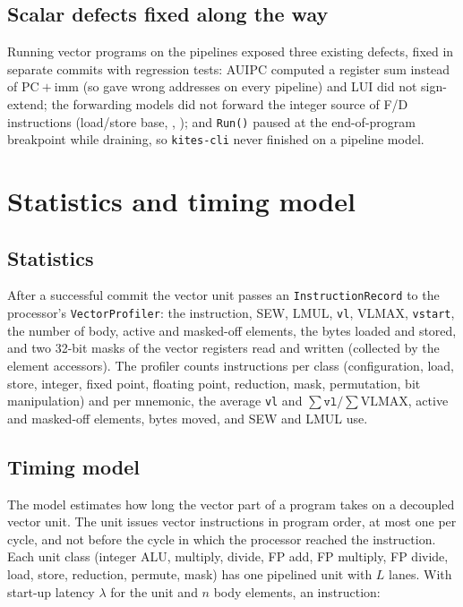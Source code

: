 \documentclass[11pt]{article}
\begin{document}
\subsection{Scalar defects fixed along the way}
Running vector programs on the pipelines exposed three existing defects, fixed in separate
commits with regression tests: AUIPC computed a register sum instead of $\mathrm{PC}+\mathrm{imm}$
(so  gave wrong addresses on every pipeline) and LUI did not sign-extend; the
forwarding models did not forward the integer source of F/D instructions (load/store base,
, ); and \texttt{Run()} paused at the end-of-program breakpoint
while draining, so \texttt{kites-cli} never finished on a pipeline model.

\section{Statistics and timing model}\label{sec:timing}

\subsection{Statistics}
After a successful commit the vector unit passes an \texttt{InstructionRecord} to the processor's
\texttt{VectorProfiler}: the instruction, SEW, LMUL, \texttt{vl}, VLMAX, \texttt{vstart}, the
number of body, active and masked-off elements, the bytes loaded and stored, and two 32-bit masks
of the vector registers read and written (collected by the element accessors). The profiler
counts instructions per class (configuration, load, store, integer, fixed point, floating point,
reduction, mask, permutation, bit manipulation) and per mnemonic, the average \texttt{vl} and
$\sum\texttt{vl} / \sum\mathrm{VLMAX}$, active and masked-off elements, bytes moved, and SEW and
LMUL use.

\subsection{Timing model}
The model estimates how long the vector part of a program takes on a decoupled vector unit. The
unit issues vector instructions in program order, at most one per cycle, and not before the cycle
in which the processor reached the instruction. Each unit class (integer ALU, multiply, divide,
FP add, FP multiply, FP divide, load, store, reduction, permute, mask) has one pipelined unit with
$L$ lanes. With start-up latency $\lambda$ for the unit and $n$ body elements, an instruction:
\end{document}
